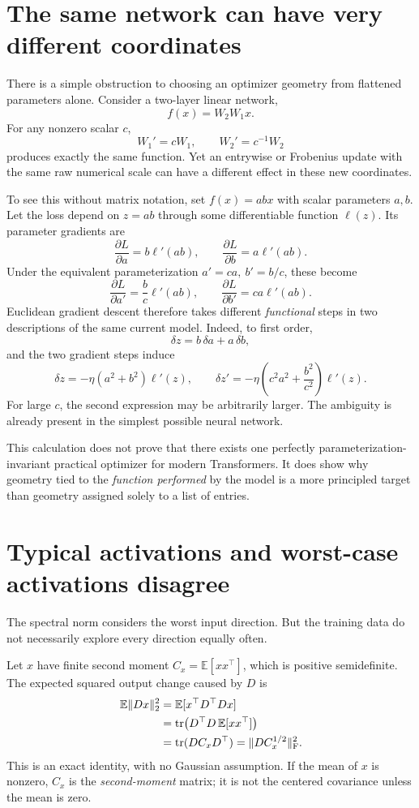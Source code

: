 \section{The same network can have very different coordinates}

There is a simple obstruction to choosing an optimizer geometry from flattened parameters alone.  Consider a two-layer linear network,
\[
 f(x)=W_2W_1x.
\]
For any nonzero scalar \(c\),
\[
 W_1'=cW_1,\qquad W_2'=c^{-1}W_2
\]
produces exactly the same function.  Yet an entrywise or Frobenius update with the same raw numerical scale can have a different effect in these new coordinates.

To see this without matrix notation, set \(f(x)=abx\) with scalar parameters \(a,b\).  Let the loss depend on \(z=ab\) through some differentiable function \(\ell(z)\).  Its parameter gradients are
\[
 \frac{\partial L}{\partial a}=b\ell'(ab),
 \qquad
 \frac{\partial L}{\partial b}=a\ell'(ab).
\]
Under the equivalent parameterization \(a'=ca,\ b'=b/c\), these become
\[
 \frac{\partial L}{\partial a'}=\frac{b}{c}\ell'(ab),
 \qquad
 \frac{\partial L}{\partial b'}=ca\ell'(ab).
\]
Euclidean gradient descent therefore takes different \emph{functional} steps in two descriptions of the same current model.  Indeed, to first order,
\[
 \delta z=b\,\delta a+a\,\delta b,
\]
and the two gradient steps induce
\[
 \delta z=-\eta(a^2+b^2)\ell'(z),\qquad
 \delta z'=-\eta\left(c^2a^2+\frac{b^2}{c^2}\right)\ell'(z).
\]
For large \(c\), the second expression may be arbitrarily larger.  The ambiguity is already present in the simplest possible neural network.

This calculation does not prove that there exists one perfectly parameterization-invariant practical optimizer for modern Transformers.  It does show why geometry tied to the \emph{function performed} by the model is a more principled target than geometry assigned solely to a list of entries.

\section{Typical activations and worst-case activations disagree}

The spectral norm considers the worst input direction.  But the training data do not necessarily explore every direction equally often.

Let \(x\) have finite second moment \(C_x=\mathbb E[xx^\top]\), which is positive semidefinite.  The expected squared output change caused by \(D\) is
\begin{align}
 \mathbb E\|Dx\|_2^2
 &=\mathbb E[x^\top D^\top Dx]\notag\\
 &=\operatorname{tr}\bigl(D^\top D\,\mathbb E[xx^\top]\bigr)\notag\\
 &=\operatorname{tr}(DC_xD^\top)
 =\|DC_x^{1/2}\|_{\mathrm F}^2.
 \label{eq:N20261017-covariance-metric}
\end{align}
This is an exact identity, with no Gaussian assumption.  If the mean of \(x\) is nonzero, \(C_x\) is the \emph{second-moment} matrix; it is not the centered covariance unless the mean is zero.

